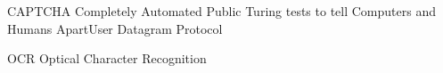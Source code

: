 \begin{siglas}
  \item[CAPTCHA] Completely
Automated  Public  Turing  tests  to  tell Computers  and
Humans ApartUser Datagram Protocol
  \item[OCR] Optical Character Recognition

\end{siglas}